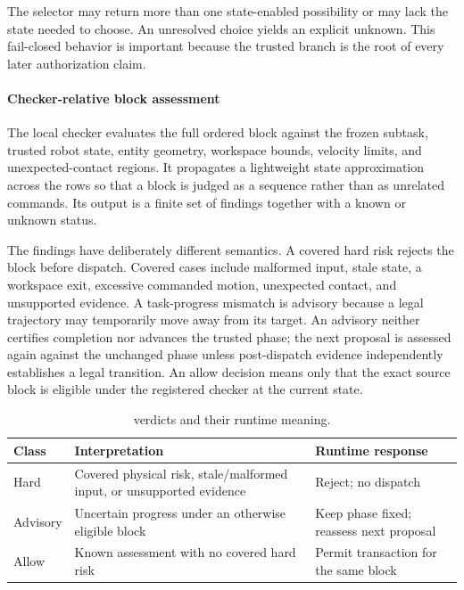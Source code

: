 The selector may return more than one state-enabled possibility or may lack the
state needed to choose.  An unresolved choice yields an explicit unknown.  This
fail-closed behavior is important because the
trusted branch is the root of every later authorization claim.

\paragraph{Checker-relative block assessment}
The local checker evaluates the full ordered block against the frozen subtask,
trusted robot state, entity geometry, workspace bounds, velocity limits, and
unexpected-contact regions.  It propagates a lightweight state approximation
across the rows so that a block is judged as a sequence rather than as unrelated
commands.  Its output is a finite set of findings together with a known or
unknown status.

The findings have deliberately different semantics.  A covered hard risk
rejects the block before dispatch.  Covered cases include malformed input,
stale state, a workspace exit, excessive commanded motion, unexpected contact,
and unsupported evidence.  A task-progress mismatch is advisory because a legal trajectory may
temporarily move away from its target.  An advisory neither certifies completion
nor advances the trusted phase; the next proposal is assessed again against the
unchanged phase unless post-dispatch evidence independently establishes a legal
transition.  An allow decision means only that the exact source block is
eligible under the registered checker at the current state.

\begin{table}[t]
\centering
\caption{\taskassessment verdicts and their runtime meaning.}
\label{tab:l1-verdicts}
\footnotesize
\begin{tabularx}{\columnwidth}{l>{\raggedright\arraybackslash}X>{\raggedright\arraybackslash}X}
\toprule
Class & Interpretation & Runtime response \\
\midrule
Hard & Covered physical risk, stale/malformed input, or unsupported evidence & Reject; no dispatch \\
Advisory & Uncertain progress under an otherwise eligible block & Keep phase fixed; reassess next proposal \\
Allow & Known assessment with no covered hard risk & Permit transaction for the same block \\
\bottomrule
\end{tabularx}
\end{table}

